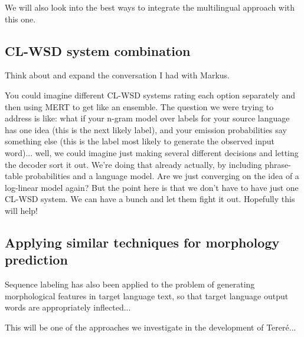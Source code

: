 We will also look into the best ways to integrate the multilingual approach
with this one.


\subsection{CL-WSD system combination}

Think about and expand the conversation I had with Markus.

You could imagine different CL-WSD systems rating each option separately and
then using MERT to get like an ensemble.
The question we were trying to address is like:
what if your n-gram model over labels for your source language has one idea
(this is the next likely label), and your emission probabilities say something
else (this is the label most likely to generate the observed input word)...
well, we could imagine just making several different decisions and letting the
decoder sort it out. We're doing that already actually, by including
phrase-table probabilities and a language model.
Are we just converging on the idea of a log-linear model again?
But the point here is that we don't have to have just one CL-WSD system. We can
have a bunch and let them fight it out. Hopefully this will help!

\subsection{Applying similar techniques for morphology prediction}

Sequence labeling has also been applied to the problem of generating
morphological features in target language text, so that target language output
words are appropriately inflected...
\cite{toutanova-suzuki-ruopp:2008:ACLMain}

This will be one of the approaches we investigate in the development of
Tereré...

